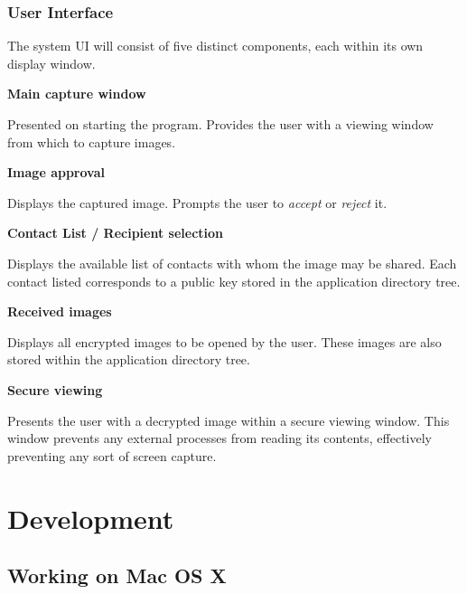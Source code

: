 \documentclass[11pt, a4paper,titlepage]{report}
\begin{document}
\subsection*{User Interface}
The system UI will consist of five distinct components, each within its own display window.
\begin{itemize*}
	\item[] \textbf{Main capture window}
		\begin{itemize*}
			\item[]  Presented on starting the program. Provides the user with a viewing window from which to capture images.
		\end{itemize*}
	\item[] \textbf{Image approval}
		\begin{itemize*}
			\item[]  Displays the captured image. Prompts the user to \emph{accept} or \emph{reject} it.
		\end{itemize*}
	\item[] \textbf{Contact List / Recipient selection}
		\begin{itemize*}
			\item[]  Displays the available list of contacts with whom the image may be shared. Each contact listed corresponds to a public key stored in the application directory tree.
		\end{itemize*}
	\item[] \textbf{Received images}
		\begin{itemize*}
			\item[]  Displays all encrypted images to be opened by the user. These images are also stored within the application directory tree.
		\end{itemize*}
	\item[] \textbf{Secure viewing}
		\begin{itemize*}
			\item[]  Presents the user with a decrypted image within a secure viewing window. This window prevents any external processes from reading its contents, effectively preventing any sort of screen capture.
		\end{itemize*}
\end{itemize*}


\chapter{Development}
\section{Working on Mac OS X}
\end{document}
